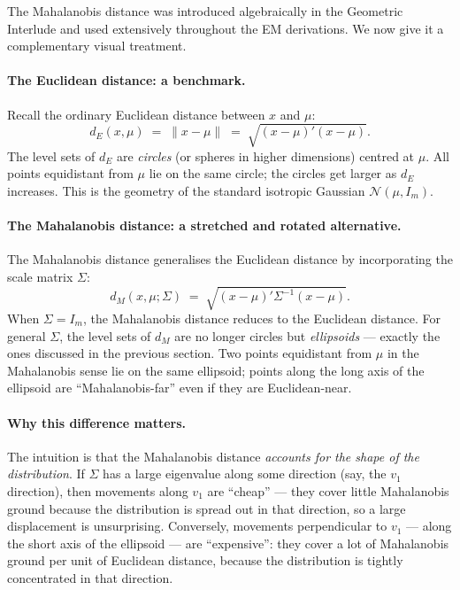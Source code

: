 \documentclass[11pt, a4paper, oneside]{article}
\begin{document}
The Mahalanobis distance was introduced algebraically in the
Geometric Interlude and used
extensively throughout the EM derivations. We now give it a
complementary visual treatment.

\paragraph{The Euclidean distance: a benchmark.}
Recall the ordinary Euclidean distance between $x$ and $\mu$:
\[
d_E(x, \mu) \;=\; \|x - \mu\| \;=\; \sqrt{(x - \mu)' (x - \mu)}.
\]
The level sets of $d_E$ are \emph{circles} (or spheres in higher
dimensions) centred at $\mu$. All points equidistant from $\mu$ lie
on the same circle; the circles get larger as $d_E$ increases. This
is the geometry of the standard isotropic Gaussian
$\mathcal{N}(\mu, I_m)$.

\paragraph{The Mahalanobis distance: a stretched and rotated alternative.}
The Mahalanobis distance generalises the Euclidean distance by
incorporating the scale matrix $\Sigma$:
\[
d_M(x, \mu; \Sigma) \;=\; \sqrt{(x - \mu)' \Sigma^{-1} (x - \mu)}.
\]
When $\Sigma = I_m$, the Mahalanobis distance reduces to the
Euclidean distance. For general $\Sigma$, the level sets of $d_M$
are no longer circles but \emph{ellipsoids} — exactly the ones
discussed in the previous section. Two points equidistant from $\mu$
in the Mahalanobis sense lie on the same ellipsoid; points along
the long axis of the ellipsoid are ``Mahalanobis-far'' even if they
are Euclidean-near.

\paragraph{Why this difference matters.}
The intuition is that the Mahalanobis distance \emph{accounts for the
shape of the distribution}. If $\Sigma$ has a large eigenvalue along
some direction (say, the $v_1$ direction), then movements along
$v_1$ are ``cheap'' — they cover little Mahalanobis ground because
the distribution is spread out in that direction, so a large
displacement is unsurprising. Conversely, movements perpendicular
to $v_1$ — along the short axis of the ellipsoid — are
``expensive'': they cover a lot of Mahalanobis ground per unit of
Euclidean distance, because the distribution is tightly concentrated
in that direction.
\end{document}
